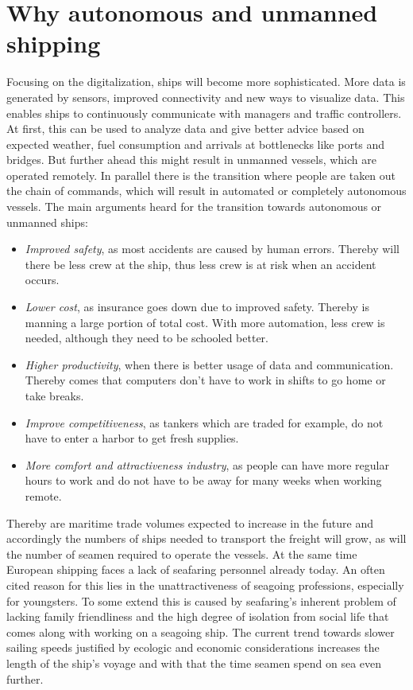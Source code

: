 \section{Why autonomous and unmanned shipping}
Focusing on the digitalization, ships will become more sophisticated. More data is generated by sensors, improved connectivity and new ways to visualize data. This enables ships to continuously communicate with managers and traffic controllers. At first, this can be used to analyze data and give better advice based on expected weather, fuel consumption and arrivals at bottlenecks like ports and bridges.
But further ahead this might result in unmanned vessels, which are operated remotely. In parallel there is the transition where people are taken out the chain of commands, which will result in automated or completely autonomous vessels. The main arguments heard for the transition towards autonomous or unmanned ships:
\begin{itemize}
	\item \emph{Improved safety}, as most accidents are caused by human errors. Thereby will there be less crew at the ship, thus less crew is at risk when an accident occurs.
	\item \emph{Lower cost}, as insurance goes down due to improved safety. Thereby is manning a large portion of total cost. With more automation, less crew is needed, although they need to be schooled better.
	\item \emph{Higher productivity}, when there is better usage of data and communication. Thereby comes that computers don't have to work in shifts to go home or take breaks.
	\item \emph{Improve competitiveness}, as tankers which are traded for example, do not have to enter a harbor to get fresh supplies.
	\item \emph{More comfort and attractiveness industry}, as people can have more regular hours to work and do not have to be away for many weeks when working remote.
\end{itemize}
Thereby are maritime trade volumes expected to increase in the future and accordingly the numbers of ships needed to transport the freight will grow, as will the number of seamen required to operate the vessels. At the same time European shipping faces a lack of seafaring personnel already today. An often cited reason for this lies in the unattractiveness of seagoing professions, especially for youngsters. To some extend this is caused by seafaring’s inherent problem of lacking family friendliness and the high degree of isolation from social life that comes along with working on a seagoing ship. The current trend towards slower sailing speeds justified by ecologic and economic considerations increases the length of the ship’s voyage and with that the time seamen spend on sea even further.


